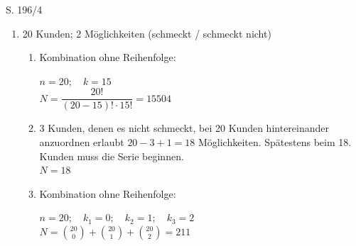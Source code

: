 \begin{Exercise}{S. 196/4}{}
\begin{enumerate}[leftmargin=*]
    \item [4.]{
        20 Kunden; 2 Möglichkeiten (schmeckt / schmeckt nicht)
        \begin{enumerate}[label=\alph*),leftmargin=*]
            \item[a)] {
                Kombination ohne Reihenfolge: \quad \begin{minipage}[t]{\linewidth}
                    $n = 20; \quad k = 15$\\[1.5ex]
                    $N = \dfrac{20!}{(20-15)! \cdot 15!} = 15504$\\
                \end{minipage}
                }
            \item[b)] {
                3 Kunden, denen es nicht schmeckt, bei 20 Kunden hintereinander anzuordnen erlaubt $20 - 3 + 1 = 18$ Möglichkeiten. Spätestens beim 18. Kunden muss die Serie beginnen.\\[1.5ex]
                $N = 18$\\
                }
            \item[c)] {
                Kombination ohne Reihenfolge: \quad \begin{minipage}[t]{\linewidth}
                    $n = 20; \quad k_{1} = 0; \quad k_{2} = 1; \quad k_{3} = 2$\\[1.5ex]
                    $N = \displaystyle \binom{20}{0} + \binom{20}{1} + \binom{20}{2} = 211$\\
                \end{minipage}
                }
        \end{enumerate}
    }
\end{enumerate}
\end{Exercise}

